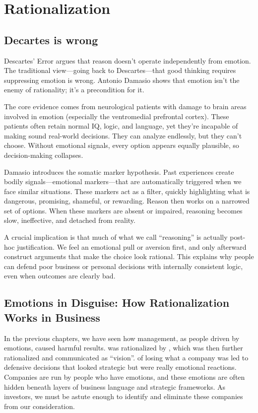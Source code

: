 \chapter{Rationalization}
\section{Decartes is wrong}
Descartes' Error argues that reason doesn't operate independently from emotion. The traditional view—going back to Descartes—that good thinking requires suppressing emotion is wrong. Antonio Damasio shows that emotion isn't the enemy of rationality; it's a precondition for it.

The core evidence comes from neurological patients with damage to brain areas involved in emotion (especially the ventromedial prefrontal cortex). These patients often retain normal IQ, logic, and language, yet they're incapable of making sound real-world decisions. They can analyze endlessly, but they can't choose. Without emotional signals, every option appears equally plausible, so decision-making collapses.

Damasio introduces the somatic marker hypothesis. Past experiences create bodily signals—emotional markers—that are automatically triggered when we face similar situations. These markers act as a filter, quickly highlighting what is dangerous, promising, shameful, or rewarding. Reason then works on a narrowed set of options. When these markers are absent or impaired, reasoning becomes slow, ineffective, and detached from reality.

A crucial implication is that much of what we call ``reasoning'' is actually post-hoc justification. We feel an emotional pull or aversion first, and only afterward construct arguments that make the choice look rational. This explains why people can defend poor business or personal decisions with internally consistent logic, even when outcomes are clearly bad.

\nocite{damasio:1994-descartes-error}

\section{Emotions in Disguise: How Rationalization Works in Business}

In the previous chapters, we have seen how management, as people driven by emotions, caused harmful results.   was rationalized by  , which was then further rationalized and communicated as ``vision''.   of losing what a company was led to defensive decisions that looked strategic but were really emotional reactions. Companies are run by people who have emotions, and these emotions are often hidden beneath layers of business language and strategic frameworks. As investors, we must be astute enough to identify and eliminate these companies from our consideration.

